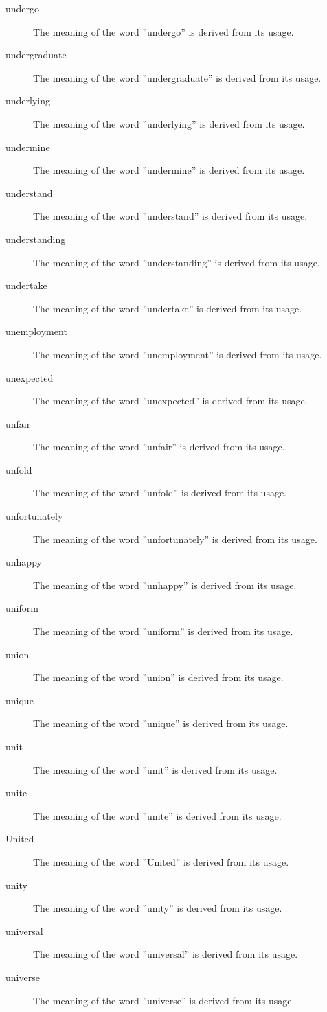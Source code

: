 \documentclass[12pt, letterpaper]{memoir}
\begin{document}
\begin{description}
\item[undergo] The meaning of the word ''undergo'' is derived from its usage.
\item[undergraduate] The meaning of the word ''undergraduate'' is derived from its usage.
\item[underlying] The meaning of the word ''underlying'' is derived from its usage.
\item[undermine] The meaning of the word ''undermine'' is derived from its usage.
\item[understand] The meaning of the word ''understand'' is derived from its usage.
\item[understanding] The meaning of the word ''understanding'' is derived from its usage.
\item[undertake] The meaning of the word ''undertake'' is derived from its usage.
\item[unemployment] The meaning of the word ''unemployment'' is derived from its usage.
\item[unexpected] The meaning of the word ''unexpected'' is derived from its usage.
\item[unfair] The meaning of the word ''unfair'' is derived from its usage.
\item[unfold] The meaning of the word ''unfold'' is derived from its usage.
\item[unfortunately] The meaning of the word ''unfortunately'' is derived from its usage.
\item[unhappy] The meaning of the word ''unhappy'' is derived from its usage.
\item[uniform] The meaning of the word ''uniform'' is derived from its usage.
\item[union] The meaning of the word ''union'' is derived from its usage.
\item[unique] The meaning of the word ''unique'' is derived from its usage.
\item[unit] The meaning of the word ''unit'' is derived from its usage.
\item[unite] The meaning of the word ''unite'' is derived from its usage.
\item[United] The meaning of the word ''United'' is derived from its usage.
\item[unity] The meaning of the word ''unity'' is derived from its usage.
\item[universal] The meaning of the word ''universal'' is derived from its usage.
\item[universe] The meaning of the word ''universe'' is derived from its usage.

\end{description}
\end{document}
